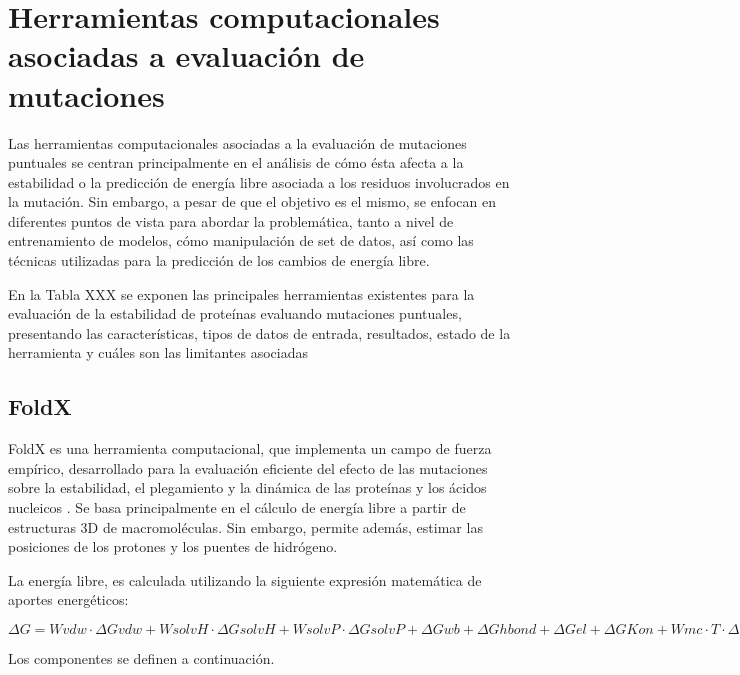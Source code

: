 \section{Herramientas computacionales asociadas a evaluación de mutaciones}

Las herramientas computacionales asociadas a la evaluación de mutaciones puntuales se centran principalmente en el análisis de cómo ésta afecta a la estabilidad o la predicción de energía libre asociada a los residuos involucrados en la mutación. Sin embargo, a pesar de que el objetivo es el mismo, se enfocan en diferentes puntos de vista para abordar la problemática, tanto a nivel de entrenamiento de modelos, cómo manipulación de set de datos, así como las técnicas utilizadas para la predicción de los cambios de energía libre.

En la Tabla XXX se exponen las principales herramientas existentes para la evaluación de la estabilidad de proteínas evaluando mutaciones puntuales, presentando las características, tipos de datos de entrada, resultados, estado de la herramienta y cuáles son las limitantes asociadas

\subsection{FoldX}

FoldX es una herramienta computacional, que implementa un campo de fuerza empírico, desarrollado para la evaluación eficiente del efecto de las mutaciones sobre la estabilidad, el plegamiento y la dinámica de las proteínas y los ácidos nucleicos \cite{Schymkowitz2005}. Se basa principalmente en el cálculo de energía libre a partir de estructuras 3D de macromoléculas. Sin embargo, permite además, estimar las posiciones de los protones y los puentes de hidrógeno. 

La energía libre, es calculada utilizando la siguiente expresión matemática de aportes energéticos:


$\Delta G=Wvdw \cdot \Delta Gvdw+WsolvH \cdot \Delta GsolvH+WsolvP \cdot \Delta GsolvP+ \Delta Gwb+ \Delta Ghbond+ \Delta Gel+ \Delta GKon+Wmc \cdot T \cdot \Delta Smc+Wsc \cdot T \cdot \Delta Ssc$

Los componentes se definen a continuación.

